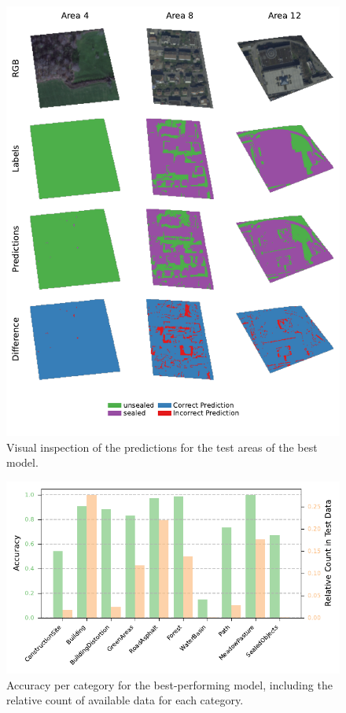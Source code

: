 \begin{figure}[H]
    \centering
    \captionsetup{width=0.8\linewidth}
    \includegraphics{figures/best_model_visual.pdf}
    \caption{Visual inspection of the predictions for the test areas of the best model.}
    \label{fig:best_model_visual}
\end{figure}

\begin{figure}[H]
    \centering
    \captionsetup{width=0.8\linewidth}
    \includegraphics{figures/best_model_accuracy_per_category.pdf}
    \caption{Accuracy per category for the best-performing model, including the relative count of available data for each category.}
    \label{fig:best_model_accuracy_per_category}
\end{figure}


